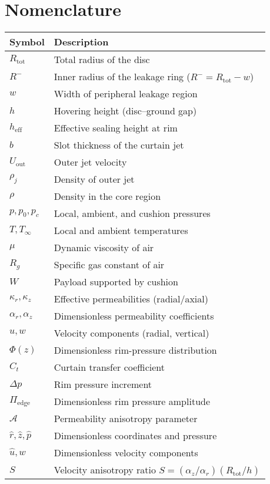 \documentclass[11pt,a4paper]{article}
\begin{document}
\section{Nomenclature}
\begin{tabular}{@{}ll@{}}
\toprule
Symbol & Description \\ \midrule
$R_{\mathrm{tot}}$ & Total radius of the disc \\
$R^{-}$ & Inner radius of the leakage ring ($R^{-}=R_{\mathrm{tot}}-w$) \\
$w$ & Width of peripheral leakage region \\
$h$ & Hovering height (disc--ground gap) \\
$h_{\mathrm{eff}}$ & Effective sealing height at rim \\
$b$ & Slot thickness of the curtain jet \\
$U_{\mathrm{out}}$ & Outer jet velocity \\
$\rho_j$ & Density of outer jet \\
$\rho$ & Density in the core region \\
$p,p_0,p_c$ & Local, ambient, and cushion pressures \\
$T,T_\infty$ & Local and ambient temperatures \\
$\mu$ & Dynamic viscosity of air \\
$R_g$ & Specific gas constant of air \\
$W$ & Payload supported by cushion \\
$\kappa_r,\kappa_z$ & Effective permeabilities (radial/axial) \\
$\alpha_r,\alpha_z$ & Dimensionless permeability coefficients \\
$u,w$ & Velocity components (radial, vertical) \\
$\Phi(z)$ & Dimensionless rim-pressure distribution \\
$C_t$ & Curtain transfer coefficient \\
$\Delta p$ & Rim pressure increment \\
$\Pi_{\mathrm{edge}}$ & Dimensionless rim pressure amplitude \\
$\mathcal{A}$ & Permeability anisotropy parameter \\
$\hat r,\hat z,\hat p$ & Dimensionless coordinates and pressure \\
$\hat u,\hat w$ & Dimensionless velocity components \\
$S$ & Velocity anisotropy ratio $S=(\alpha_z/\alpha_r)(R_{\mathrm{tot}}/h)$ \\ \bottomrule
\end{tabular}
\end{document}
